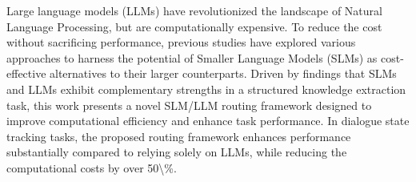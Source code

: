 Large language models (LLMs) have revolutionized the landscape of Natural Language Processing, but are computationally expensive. To reduce the cost without sacrificing performance, previous studies have explored various approaches to harness the potential of Smaller Language Models (SLMs) as cost-effective alternatives to their larger counterparts. Driven by findings that SLMs and LLMs exhibit complementary strengths in a structured knowledge extraction task, this work presents a novel SLM/LLM routing framework designed to improve computational efficiency and enhance task performance. In dialogue state tracking tasks, the proposed routing framework enhances performance substantially compared to relying solely on LLMs, while reducing the computational costs by over 50\textbackslash{}\%.